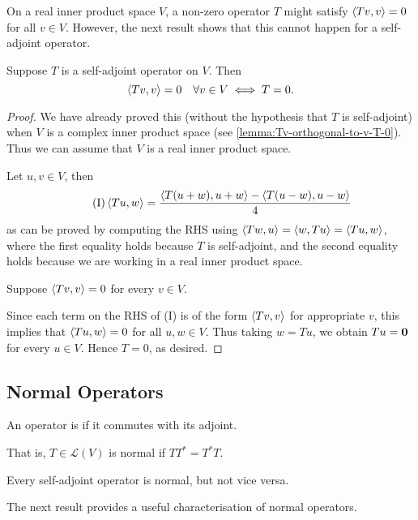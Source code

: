 On a real inner product space $V$, a non-zero operator $T$ might satisfy $\left\langle Tv,v\right\rangle=0$ for all $v\in V$. 
However, the next result shows that this cannot happen for a self-adjoint operator.

\begin{lemma}
Suppose $T$ is a self-adjoint operator on $V$. Then
\[\left\langle Tv,v\right\rangle=0\quad\forall v\in V\iff T=0.\]
\end{lemma}

\begin{proof}
We have already proved this (without the hypothesis that $T$ is self-adjoint) when $V$ is a complex inner product space (see \ref{lemma:Tv-orthogonal-to-v-T-0}). Thus we can assume that $V$ is a real inner product space.

\fbox{$\impliedby$} Let $u,v\in V$, then
\begin{equation*}\tag{I}
\left\langle Tu,w\right\rangle=\frac{\left\langle T(u+w),u+w\right\rangle-\left\langle T(u-w),u-w\right\rangle}{4}
\end{equation*}
as can be proved by computing the RHS using $\left\langle Tw,u\right\rangle=\left\langle w,Tu\right\rangle=\left\langle Tu,w\right\rangle$, where the first equality holds because $T$ is self-adjoint, and the second equality holds because we are working in a real inner product space.

\fbox{$\implies$} Suppose $\left\langle Tv,v\right\rangle=0$ for every $v\in V$.

Since each term on the RHS of (I) is of the form $\left\langle Tv,v\right\rangle$ for appropriate $v$, this implies that $\left\langle Tu,w\right\rangle=0$ for all $u,w\in V$. 
Thus taking $w=Tu$, we obtain $Tu=\vb{0}$ for every $u\in V$. 
Hence $T=0$, as desired.
\end{proof}
\pagebreak

\subsection{Normal Operators}
\begin{definition}
An operator is  if it commutes with its adjoint.
\end{definition}

That is, $T\in\mathcal{L}(V)$ is normal if $TT^*=T^*T$.

\begin{remark}
Every self-adjoint operator is normal, but not vice versa.
\end{remark}

The next result provides a useful characterisation of normal operators.

